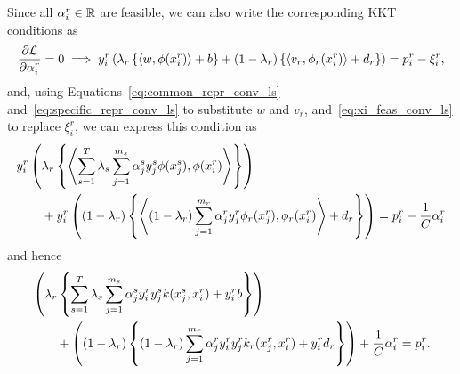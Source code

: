 Since all $\alpha_i^r \in \mathbb{R}$ are feasible, we can also write the corresponding KKT conditions as
\begin{equation}
    \nonumber
    \frac{\partial \mathcal{L}}{\partial \alpha_i^r} = 0 \implies y_{i}^r \left(\lambda_r \left\lbrace \left\langle w, \phi(x_{i}^r) \right\rangle + b  \right\rbrace + (1 - \lambda_r) \left\lbrace \left\langle {v}_r, \phi_r(x_{i}^r) \right\rangle + d_r \right\rbrace  \right) = p_{i}^r - \xi_{i}^r  ,
\end{equation}
and, using Equations~\eqref{eq:common_repr_conv_ls} and~\eqref{eq:specific_repr_conv_ls} to substitute $w$ and $v_r$, and~\eqref{eq:xi_feas_conv_ls} to replace $\xi_i^r$, we can express this condition as 
\begin{equation}
    \begin{aligned}
        &y_{i}^r \left(\lambda_r \left\lbrace \left\langle\sum_{s= 1}^T \lambda_s \sum_{j=1}^{m_s} {\alpha_j^s} y_j^s \phi(x_j^s) , \phi(x_{i}^r) \right\rangle  \right\rbrace \right) \\
        &\qquad+ y_{i}^r \left( (1 - \lambda_r) \left\lbrace \left\langle (1 - \lambda_r) \sum_{j=1}^{m_r} {\alpha_j^r}  y_j^r \phi_r(x_j^r) , \phi_r(x_{i}^r) \right\rangle + d_r \right\rbrace  \right) = p_{i}^r - \frac{1}{C}\alpha_{i}^r  \\
    \end{aligned}
\end{equation}
and hence
\begin{equation}
    \begin{aligned}
        &\left(\lambda_r \left\lbrace \sum_{s= 1}^T \lambda_s \sum_{j=1}^{m_s} {\alpha_j^s} y_{i}^r y_j^s k(x_j^s, x_{i}^r)  + y_i^r b \right\rbrace \right) \\
        &\qquad+  \left( (1 - \lambda_r) \left\lbrace (1 - \lambda_r) \sum_{j=1}^{m_r} {\alpha_j^r} y_{i}^r  y_j^r k_r(x_j^r, x_{i}^r)  + y_i^r d_r \right\rbrace  \right) + \frac{1}{C}\alpha_{i}^r  = p_{i}^r .
    \end{aligned}
\end{equation}

